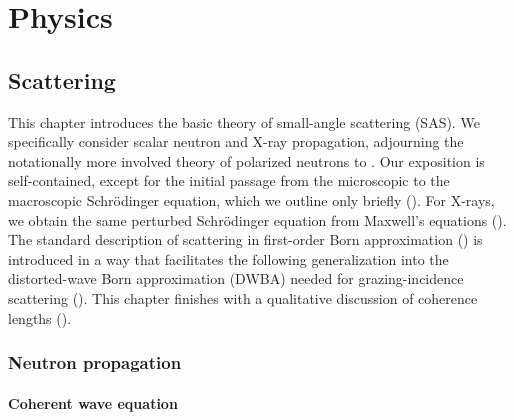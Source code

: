 
\part{Physics}\label{PPHYS}

\chapter{Scattering}  \label{SSca}

%

This chapter introduces the basic theory of small-angle scattering (SAS).
We specifically consider scalar neutron and X-ray propagation,
adjourning the notationally more involved
theory of polarized neutrons to .
Our exposition is self-contained,
except for the initial passage from the microscopic
to the macroscopic Schrödinger equation,
which we outline only briefly ().
For X-rays, we obtain the same perturbed Schrödinger equation from Maxwell's equations
().
The standard description of scattering in first-order Born approximation
()
is introduced in a way that facilitates the following generalization
into the distorted-wave Born approximation (DWBA)
needed for grazing-incidence scattering ().
This chapter finishes with a qualitative discussion
of coherence lengths ().

\section{Neutron propagation}\label{Swave}
%
%

\subsection{Coherent wave equation}\label{ScohWave}

